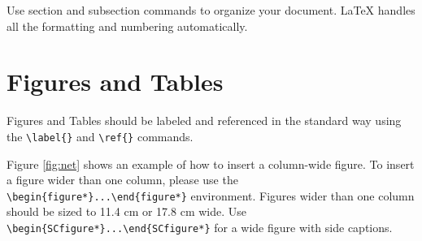 \documentclass[9pt,twocolumn,twoside]{ilcss}
\begin{document}
Use section and subsection commands to organize your document. \LaTeX{} handles all the formatting and numbering automatically. 

\section{Figures and Tables}

Figures and Tables should be labeled and referenced in the standard way using the \verb|\label{}| and \verb|\ref{}| commands.




Figure \ref{fig:net} shows an example of how to insert a column-wide figure. To insert a figure wider than one column, please use the \verb|\begin{figure*}...\end{figure*}| environment. Figures wider than one column should be sized to 11.4 cm or 17.8 cm wide. Use \verb|\begin{SCfigure*}...\end{SCfigure*}| for a wide figure with side captions.
\end{document}
